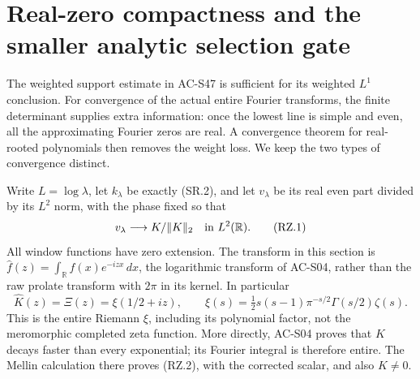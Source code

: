 \section{Real-zero compactness and the smaller analytic selection gate}
\label{sec:spectral-real-zero-selection}

The weighted support estimate in AC-S47 is sufficient for its weighted
\(L^1\) conclusion.  For convergence of the actual entire Fourier
transforms, the finite determinant supplies extra information: once the
lowest line is simple and even, all the approximating Fourier zeros are
real.  A convergence theorem for real-rooted polynomials then removes the
weight loss.  We keep the two types of convergence distinct.

Write \(L=\log\lambda\), let \(k_\lambda\) be exactly (SR.2), and let
\(v_\lambda\) be its real even part divided by its \(L^2\) norm, with the
phase fixed so that
\[
 v_\lambda\longrightarrow K/\|K\|_2
       \quad\hbox{in }L^2(\mathbb R).
 \tag{RZ.1}
\]
All window functions have zero extension.  The transform in this section
is \(\widehat f(z)=\int_{\mathbb R}f(x)e^{-izx}\,dx\), the logarithmic
transform of AC-S04, rather than the raw prolate transform with \(2\pi\)
in its kernel.  In particular
\[
 \widehat K(z)=\Xi(z)=\xi(1/2+iz),\qquad
 \xi(s)=\tfrac12s(s-1)\pi^{-s/2}\Gamma(s/2)\zeta(s).
 \tag{RZ.2}
\]
This is the entire Riemann \(\xi\), including its polynomial factor,
not the meromorphic completed zeta function.  More directly, AC-S04
proves that \(K\) decays faster than every exponential; its Fourier
integral is therefore entire.  The Mellin calculation there proves
(RZ.2), with the corrected scalar, and also \(K\ne0\).

